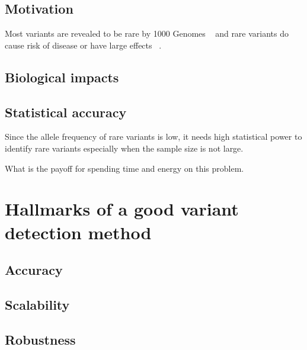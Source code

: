 \documentclass[11pt,reqno]{amsart}
\begin{document}
\subsection{Motivation}
Most variants are revealed to be rare by 1000 Genomes ~\citep{10002010map} and rare variants do cause risk of disease or have large effects ~\citep{kosmicki2016discovery}.

\subsection{Biological impacts}


\subsection{Statistical accuracy}
Since the allele frequency of rare variants is low, it needs high statistical power to identify rare variants especially when the sample size is not large.

What is the payoff for spending time and energy on this problem.




\section{Hallmarks of a good variant detection method}
\subsection{Accuracy}

\subsection{Scalability}

\subsection{Robustness}
\end{document}
